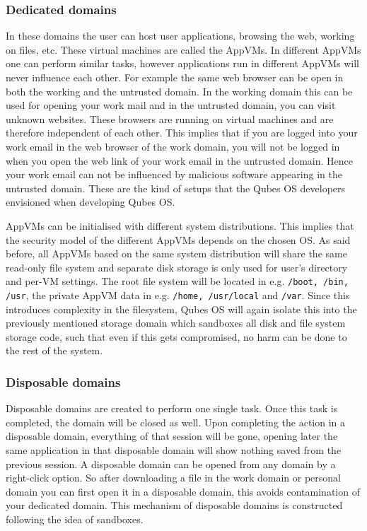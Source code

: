\documentclass[runningheads,a4paper]{article}
\begin{document}
\subsubsection{Dedicated domains}

In these domains the user can host user applications, browsing the
web, working on files, etc. These virtual machines are called the
AppVMs. In different AppVMs one can perform similar tasks, however
applications run in different AppVMs will never influence each other. 
For example the same web browser can be
open in both the working and the untrusted domain. In the working
domain this can be used for opening your work mail and in the
untrusted domain, you can visit unknown websites. These browsers are
running on virtual machines and are therefore independent of each
other. This implies that if you are logged into your work email in
the web browser of the work domain, you will not be logged in when you
open the web link of your work email in the untrusted domain. Hence
your work email can not be influenced by malicious software appearing
in the untrusted domain. These are the kind of setups that the Qubes
OS developers envisioned when developing Qubes OS.

AppVMs can be initialised with different system
distributions. This implies that the security model of the different 
AppVMs depends on the chosen OS. As said before, all AppVMs
based on the same system distribution will share the same read-only
file system and separate disk storage is only used for user's
directory and per-VM settings. The root file system will be located in
e.g. \texttt{/boot, /bin, /usr}, the private AppVM data in
e.g. \texttt{/home, /usr/local} and \texttt{/var}. 
Since this introduces complexity in the
filesystem, Qubes OS will again isolate this into the previously
mentioned storage domain which sandboxes
all disk and file system storage code, such that even if this gets
compromised, no harm can be done to the rest of the system.

\subsubsection{Disposable domains}

Disposable domains are created to perform one single task. Once this
task is completed, the domain will be closed as well. Upon completing
the action in a disposable domain, everything of that session will be
gone, opening later the same application in that disposable domain
will show nothing saved from the previous session. A disposable domain
can be opened from any domain by a right-click option. So after
downloading a file in the work domain or personal domain you can first
open it in a disposable domain, this avoids contamination of your
dedicated domain. This mechanism of disposable domains is constructed
following the idea of sandboxes.
\end{document}
